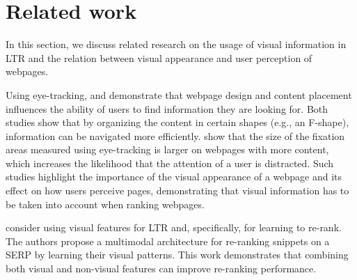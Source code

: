 
\section{Related work}
\label{sec:relatedwork}


%

In this section, we discuss related research on the usage of visual information in \ac{LTR} and the relation between visual appearance and user perception of webpages.

Using eye-tracking, \citet{nielsen2006f} and \citet{pernice2017f} demonstrate that webpage design and content placement influences the ability of users to find information they are looking for. 
Both studies show that by organizing the content in certain shapes (e.g., an F-shape), information can be navigated more efficiently.
\citet{wang2014eye} show that the size of the fixation areas measured using eye-tracking is larger on webpages with more content, which increases the likelihood that the attention of a user is distracted.
Such studies highlight the importance of the visual appearance of a webpage and its effect on how users perceive pages, demonstrating that visual information has to be taken into account when ranking webpages.

\citet{zhang2018relevance} consider using visual features for \ac{LTR} and, specifically, for learning to re-rank.
The authors propose a multimodal architecture for re-ranking snippets on a \ac{SERP} by learning their visual patterns.
This work demonstrates that combining both visual and non-visual features can improve re-ranking performance.

